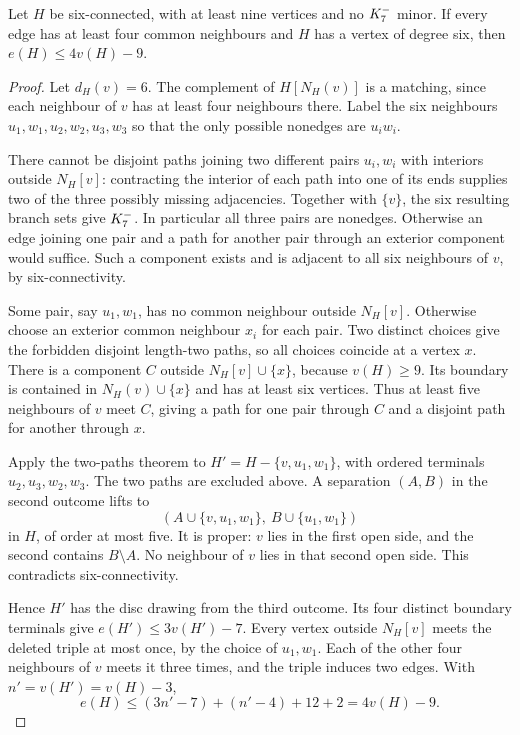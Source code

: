 \begin{lemma}\label{gl:degree-six-terminal}
Let $H$ be six-connected, with at least nine vertices and no
$K_7^{-}$ minor. If every edge has at least four common neighbours
and $H$ has a vertex of degree six, then $e(H)\leq4v(H)-9$.
\end{lemma}

\begin{proof}
Let $d_H(v)=6$. The complement of $H[N_H(v)]$ is a matching, since
each neighbour of $v$ has at least four neighbours there. Label the
six neighbours $u_1,w_1,u_2,w_2,u_3,w_3$ so that the only possible
nonedges are $u_iw_i$.

There cannot be disjoint paths joining two different pairs $u_i,w_i$
with interiors outside $N_H[v]$: contracting the interior of each
path into one of its ends supplies two of the three possibly missing
adjacencies. Together with $\{v\}$, the six resulting branch sets give
$K_7^{-}$. In particular all three pairs are nonedges. Otherwise
an edge joining one pair and a path for another pair through an exterior
component would suffice. Such a component exists and is adjacent
to all six neighbours of $v$, by six-connectivity.

Some pair, say $u_1,w_1$, has no common neighbour outside $N_H[v]$.
Otherwise choose an exterior common neighbour $x_i$ for each pair.
Two distinct choices give the forbidden disjoint length-two paths,
so all choices coincide at a vertex $x$. There is a component $C$
outside $N_H[v]\cup\{x\}$, because $v(H)\geq9$. Its boundary is
contained in $N_H(v)\cup\{x\}$ and has at least six vertices.
Thus at least five neighbours of $v$ meet $C$, giving a path for
one pair through $C$ and a disjoint path for another through $x$.

Apply the two-paths theorem to
$H'=H-\{v,u_1,w_1\}$, with ordered terminals $u_2,u_3,w_2,w_3$.
The two paths are excluded above. A separation $(A,B)$ in the
second outcome lifts to
\[
 (A\cup\{v,u_1,w_1\},\ B\cup\{u_1,w_1\})
\]
in $H$, of order at most five. It is proper: $v$ lies in the first
open side, and the second contains $B\setminus A$. No neighbour
of $v$ lies in that second open side. This contradicts
six-connectivity.

Hence $H'$ has the disc drawing from the third outcome. Its four
distinct boundary terminals give $e(H')\leq3v(H')-7$.
Every vertex outside $N_H[v]$
meets the deleted triple at most once, by the choice of $u_1,w_1$.
Each of the other four neighbours of $v$ meets it three times,
and the triple induces two edges. With $n'=v(H')=v(H)-3$,
\[
 e(H)\leq(3n'-7)+(n'-4)+12+2=4v(H)-9.
\]
\end{proof}

